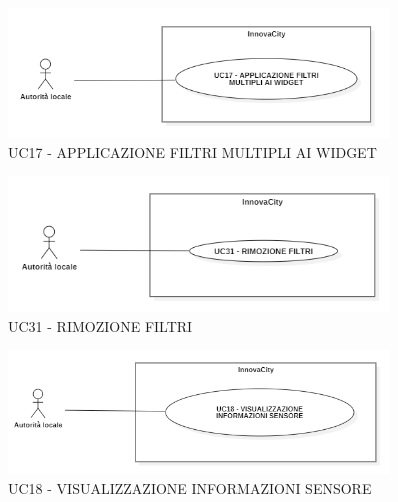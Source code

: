 
\begin{figure}[H]
    \centering
    \includegraphics[width=0.9\textwidth]{../Images/uc17.PNG}
    \caption{UC17 - APPLICAZIONE FILTRI MULTIPLI AI WIDGET}
    \label{fig:UC7}
\end{figure}


\begin{figure}[H]
    \centering
    \includegraphics[width=0.9\textwidth]{../Images/uc31.PNG}
    \caption{UC31 - RIMOZIONE FILTRI}
    \label{fig:UC7}
\end{figure}

\begin{figure}[H]
    \centering
    \includegraphics[width=0.9\textwidth]{../Images/uc18.PNG}
    \caption{UC18 - VISUALIZZAZIONE INFORMAZIONI SENSORE}
    \label{fig:UC7}
\end{figure}



